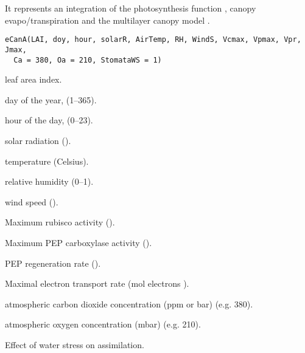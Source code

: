 \documentclass[letterpaper]{book}
\begin{document}
%
\begin{Description}\relax
It represents an integration of the photosynthesis function
, canopy evapo/transpiration and the
multilayer canopy model .
\end{Description}
%
\begin{Usage}
\begin{verbatim}
eCanA(LAI, doy, hour, solarR, AirTemp, RH, WindS, Vcmax, Vpmax, Vpr, Jmax,
  Ca = 380, Oa = 210, StomataWS = 1)
\end{verbatim}
\end{Usage}
%
\begin{Arguments}
\begin{ldescription}
\item[\code{LAI}] leaf area index.

\item[\code{doy}] day of the year, (1--365).

\item[\code{hour}] hour of the day, (0--23).

\item[\code{solarR}] solar radiation ().

\item[\code{AirTemp}] temperature (Celsius).

\item[\code{RH}] relative humidity (0--1).

\item[\code{WindS}] wind speed ().

\item[\code{Vcmax}] Maximum rubisco activity ().

\item[\code{Vpmax}] Maximum PEP carboxylase activity ().

\item[\code{Vpr}] PEP regeneration rate ().

\item[\code{Jmax}] Maximal electron transport rate
(\eqn{\mu}{}mol electrons 
).

\item[\code{Ca}] atmospheric carbon dioxide concentration (ppm
or \eqn{\mu}{}bar) (e.g. 380).

\item[\code{Oa}] atmospheric oxygen concentration (mbar) (e.g.
210).

\item[\code{StomataWS}] Effect of water stress on assimilation.
\end{ldescription}
\end{Arguments}
\end{document}
